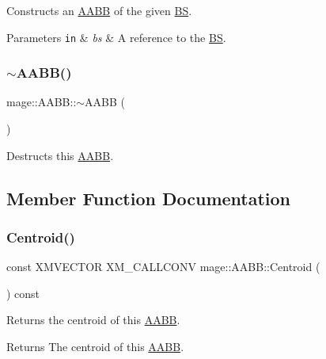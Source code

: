 Constructs an \hyperlink{classmage_1_1_a_a_b_b}{A\+A\+BB} of the given \hyperlink{classmage_1_1_b_s}{BS}.


\begin{DoxyParams}[1]{Parameters}
\mbox{\tt in}  & {\em bs} & A reference to the \hyperlink{classmage_1_1_b_s}{BS}. \\
\hline
\end{DoxyParams}
\hypertarget{classmage_1_1_a_a_b_b_a0fa31372f7488cb30b886c77bd676f17}{}\label{classmage_1_1_a_a_b_b_a0fa31372f7488cb30b886c77bd676f17} 
\subsubsection{\texorpdfstring{$\sim$\+A\+A\+B\+B()}{~AABB()}}
{\footnotesize\ttfamily mage\+::\+A\+A\+B\+B\+::$\sim$\+A\+A\+BB (\begin{DoxyParamCaption}{ }\end{DoxyParamCaption})\hspace{0.3cm}{\ttfamily [default]}}

Destructs this \hyperlink{classmage_1_1_a_a_b_b}{A\+A\+BB}. 

\subsection{Member Function Documentation}
\hypertarget{classmage_1_1_a_a_b_b_a7555db5bea72d1e7ba04931fcbb88aa0}{}\label{classmage_1_1_a_a_b_b_a7555db5bea72d1e7ba04931fcbb88aa0} 
\subsubsection{\texorpdfstring{Centroid()}{Centroid()}}
{\footnotesize\ttfamily const X\+M\+V\+E\+C\+T\+OR X\+M\+\_\+\+C\+A\+L\+L\+C\+O\+NV mage\+::\+A\+A\+B\+B\+::\+Centroid (\begin{DoxyParamCaption}{ }\end{DoxyParamCaption}) const\hspace{0.3cm}{\ttfamily [noexcept]}}

Returns the centroid of this \hyperlink{classmage_1_1_a_a_b_b}{A\+A\+BB}.

\begin{DoxyReturn}{Returns}
The centroid of this \hyperlink{classmage_1_1_a_a_b_b}{A\+A\+BB}. 
\end{DoxyReturn}
\hypertarget{classmage_1_1_a_a_b_b_a4397eb9619f0c414dcb11819196784ed}{}\label{classmage_1_1_a_a_b_b_a4397eb9619f0c414dcb11819196784ed} 
